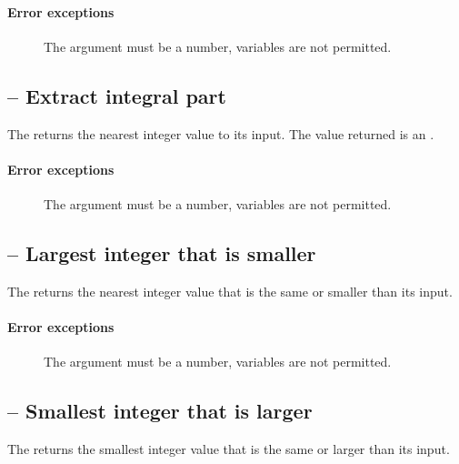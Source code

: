 \paragraph{Error exceptions}
\begin{description}
\item[]
The argument must be a number, variables are not permitted.
\end{description}

\subsection{ -- Extract integral part}
\label{arith:itrunc}
The  returns the nearest integer value to its input. The value returned is an .

\paragraph{Error exceptions}
\begin{description}
\item[]
The argument must be a number, variables are not permitted.
\end{description}

\subsection{ -- Largest integer that is smaller}
The  returns the nearest integer value that is the same or smaller than its input.

\paragraph{Error exceptions}
\begin{description}
\item[]
The argument must be a number, variables are not permitted.
\end{description}

\subsection{ -- Smallest integer that is larger}
The  returns the smallest integer value that is the same or larger than its input.

